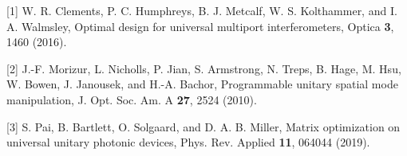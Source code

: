 \documentclass{article}
\begin{document}
\footnotesize
[1] W. R. Clements, P. C. Humphreys, B. J. Metcalf, W. S. Kolthammer, and I. A. Walmsley, Optimal design for universal multiport interferometers, Optica \textbf{3}, 1460 (2016).

[2] J.-F. Morizur, L. Nicholls, P. Jian, S. Armstrong, N. Treps, B. Hage, M. Hsu, W. Bowen, J. Janousek, and H.-A. Bachor, Programmable unitary spatial mode manipulation, J. Opt. Soc. Am. A \textbf{27}, 2524 (2010).

[3] S. Pai, B. Bartlett, O. Solgaard, and D. A. B. Miller, Matrix optimization on universal unitary photonic devices, Phys. Rev. Applied \textbf{11}, 064044 (2019).
\end{document}
